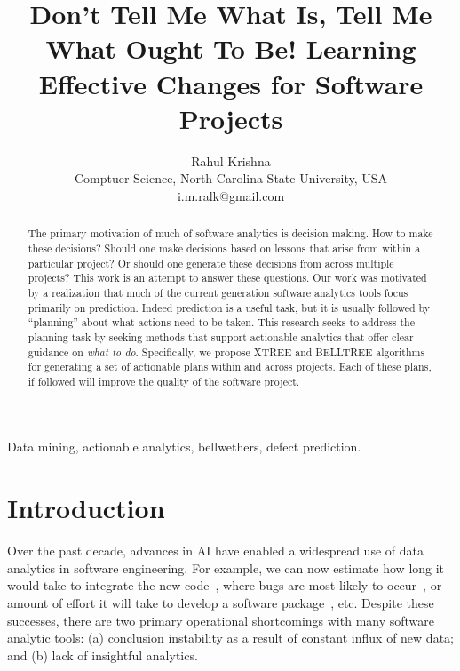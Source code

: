 \documentclass[conference]{IEEEtran}
\newcommand{\be}{\begin{enumerate}}
\newcommand{\ee}{\end{enumerate}}
\theoremstyle{break}
\begin{document}
\title{Don't Tell Me What Is, Tell Me What Ought To Be! 
Learning Effective Changes for  Software Projects
\\[-0.9cm]}
\author{Rahul Krishna\\
	Comptuer Science, North Carolina State University, USA\\
	i.m.ralk@gmail.com}

\maketitle


\begin{abstract}

The primary motivation of much of software analytics is decision making. How to make these decisions? Should one make decisions based on lessons that arise from within a particular project? Or should one generate these decisions from across multiple projects? This work is an attempt to answer these questions. Our work was motivated by a realization that much of the current generation software analytics tools focus primarily on prediction. Indeed prediction is a useful task, but it is usually followed by ``planning'' about what actions need to be taken. This research seeks to address the planning task by seeking methods that support actionable analytics that offer clear guidance on \textit{what to do}. Specifically, we propose XTREE and BELLTREE algorithms for generating a set of actionable plans within and across projects. Each of these plans, if followed will improve the quality of the software project.

\end{abstract}

\begin{IEEEkeywords}
Data mining, actionable analytics, bellwethers, defect prediction.
\end{IEEEkeywords}


\section{Introduction}
\label{sect:intro}

Over the past decade, advances in AI have enabled a widespread use of data analytics in software engineering. For example, we can now estimate how long it would take to integrate the new code~\cite{czer11}, where bugs are most likely to occur~\cite{Menzies2007a}, or amount of effort it will take to develop a software package~\cite{turhan11}, etc. Despite these successes, there are two primary operational shortcomings with many software analytic tools: (a) conclusion instability as a result of constant influx of new data; and (b) lack of insightful analytics.
\end{document}
